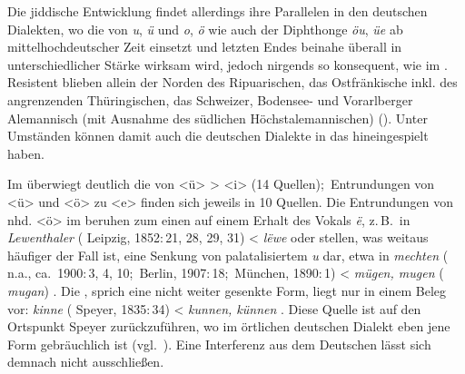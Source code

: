 
Die jiddische Entwicklung findet allerdings ihre Parallelen in den deutschen Dialekten, wo die  von {\mhd} \textit{u}, \textit{ü} und \textit{o}, \textit{ö} wie auch der Diphthonge \textit{öu}, \textit{üe} ab mittelhochdeutscher Zeit einsetzt und letzten Endes beinahe überall in unterschiedlicher Stärke wirksam wird, jedoch nirgends so konsequent, wie im \hai{{\OJ}}. Resistent blieben allein der Norden des Ripuarischen, das Ostfränkische inkl. des angrenzenden Thüringischen, das Schweizer, Bodensee- und Vorarlberger Alemannisch (mit Ausnahme des südlichen Höchstalemannischen) (\citealt[204–208]{Schirmunski1962}). Unter Umständen können damit auch die deutschen Dialekte in das \hai{{\LiJi}} hineingespielt haben.
 
 Im  überwiegt deutlich die  von <ü> > <i> (14 Quellen);\, Entrundungen von <ü> und <ö> zu <e> finden sich jeweils in 10 Quellen. Die Entrundungen von nhd. <ö> im  beruhen zum einen auf einem Erhalt des {\mhd} Vokals \textit{ë}, z.\,B.\, in \textit{Lewenthaler}  ( Leipzig, 1852:\,21, 28, 29, 31) < {\mhd} \textit{lëwe} \parencite[Bd. 1, Sp. 1893]{Lexer1992} oder stellen, was weitaus häufiger der Fall ist, eine Senkung von palatalisiertem {\germ} \textit{u} dar, etwa in \textit{mechten}  ( n.a., ca.\, 1900:\,3, 4, 10;\,  Berlin, 1907:\,18;\,  München, 1890:\,1) < {\mhd} \textit{mügen, mugen} ({\ahd} \textit{mugan}) \parencite[Bd. 1, Sp. 2218]{Lexer1992}. Die  , sprich eine nicht weiter gesenkte Form, liegt nur in einem Beleg vor: \textit{kinne}  ( Speyer, 1835:\,34) < {\mhd} \textit{kunnen, künnen} \parencite[Bd. 1, Sp. 1778]{Lexer1992}. Diese Quelle ist auf den Ortspunkt Speyer zurückzuführen, wo im örtlichen deutschen Dialekt eben jene Form gebräuchlich ist (vgl.\,  \citeyear[Bd. 4, Sp. 445]{PfaelzWB}). Eine Interferenz aus dem Deutschen lässt sich demnach nicht ausschließen. 
 
